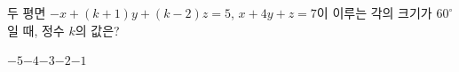 두 평면 $-x+(k+1)y+(k-2)z=5$, $x+4y+z=7$이 이루는 각의 크기가 $60^\circ$일 때, 정수 $k$의 값은?
\begin{choices32}{$-5$}{$-4$}{$-3$}{$-2$}{$-1$}\end{choices32}
